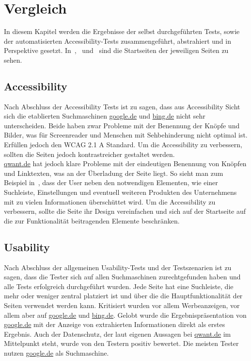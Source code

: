 \section{Vergleich}\label{sec:vergleich}
In diesem Kapitel werden die Ergebnisse der selbst durchgeführten Tests,
sowie der automatisierten Accessibility-Tests zusammengeführt, abstrahiert und in Perspektive gesetzt.
In~,~ und~ sind die Startseiten der jeweiligen Seiten zu sehen.\\

\subsection*{Accessibility}\label{subsec:accessibility}
Nach Abschluss der Accessibility Tests ist zu sagen,
dass aus Accessibility Sicht sich die etablierten Suchmaschinen \url{google.de} und \url{bing.de} nicht sehr unterscheiden.
Beide haben zwar Probleme mit der Benennung der Knöpfe und Bilder, was für Screenreader und Menschen mit Sehbehinderung nicht optimal ist.
Erfüllen jedoch den WCAG 2.1 A Standard.
Um die Accessibility zu verbessern, sollten die Seiten jedoch kontrastreicher gestaltet werden.\\

\url{qwant.de} hat jedoch klare Probleme mit der eindeutigen Benennung von Knöpfen und Linktexten, was an der Überladung der Seite liegt.
So sieht man zum Beispiel in~, dass der User neben den notwendigen Elementen,
wie einer Suchleiste, Einstellungen und eventuell weiteren Produkten des Unternehmens mit zu vielen Informationen überschüttet wird.
Um die Accessibility zu verbessern, sollte die Seite ihr Design vereinfachen und sich auf der Startseite auf die zur Funktionalität beitragenden Elemente beschränken.

\subsection*{Usability}\label{subsec:usability}
Nach Abschluss der allgemeinen Usability-Tests und der Testszenarien ist zu sagen, dass
die Tester sich auf allen Suchmaschinen zurechtgefunden haben und alle Tests erfolgreich durchgeführt wurden.
Jede Seite hat eine Suchleiste, die mehr oder weniger zentral platziert ist und über die die Hauptfunktionalität der Seiten verwendet werden kann.
Kritisiert wurden vor allem Werbeanzeigen, vor allem aber auf \url{google.de} und \url{bing.de}.
Gelobt wurde die Ergebnispräsentation von \url{google.de} mit der Anzeige von extrahierten Informationen direkt als erstes Ergebnis.
Auch der Datenschutz, der laut eigenen Aussagen bei \url{qwant.de} im Mittelpunkt steht, wurde von den Testern positiv bewertet.
Die meisten Tester nutzen \url{google.de} als Suchmaschine.

